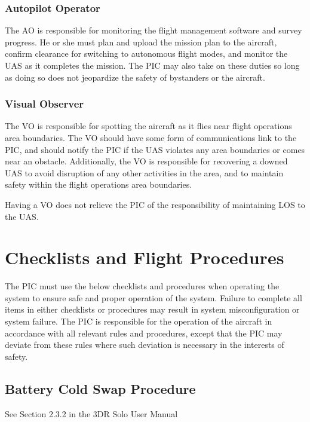 \documentclass{report}
\begin{document}
		\subsection{Autopilot Operator}
			The \gls{AO} is responsible for monitoring the flight management software and survey progress.  He or she must plan and upload the mission plan to the aircraft, confirm clearance for switching to autonomous flight modes, and monitor the \gls{UAS} as it completes the mission.  The \gls{PIC} may also take on these duties so long as doing so does not jeopardize the safety of bystanders or the aircraft.
		\subsection{Visual Observer}
			The \gls{VO} is responsible for spotting the aircraft as it flies near flight operations area boundaries.  The \gls{VO} should have some form of communications link to the PIC, and should notify the PIC if the \gls{UAS} violates any area boundaries or comes near an obstacle.  Additionally, the \gls{VO} is responsible for recovering a downed \gls{UAS} to avoid disruption of any other activities in the area, and to maintain safety within the flight operations area boundaries.

			Having a \gls{VO} does not relieve the \gls{PIC} of the responsibility of maintaining \gls{LOS} to the \gls{UAS}.
\chapter{Checklists and Flight Procedures}
	The \gls{PIC} must use the below checklists and procedures when operating the system to ensure safe and proper operation of the system.  Failure to complete all items in either checklists or procedures may result in system misconfiguration or system failure.  The \gls{PIC} is responsible for the operation of the aircraft in accordance with all relevant rules and procedures, except that the \gls{PIC} may deviate from these rules where such deviation is necessary in the interests of safety.
	\section{Battery Cold Swap Procedure}
		See Section 2.3.2 in the 3DR Solo User Manual
\end{document}
